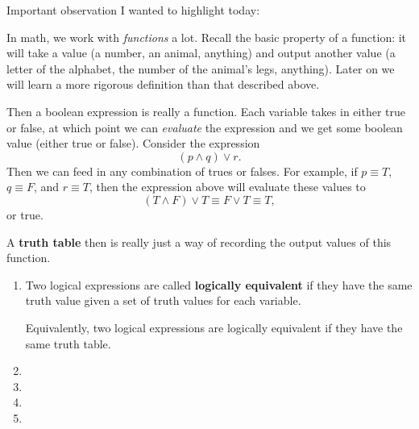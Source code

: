 Important observation I wanted to highlight today:

\begin{tcolorbox}
In math, we work with \textit{functions} a lot. Recall the basic property of a function: it will take a value (a number, an animal, anything) and output another value (a letter of the alphabet, the number of the animal's legs, anything). Later on we will learn a more rigorous definition than that described above.
\end{tcolorbox}

Then a boolean expression is really a function. Each variable takes in either true or false, at which point we can \textit{evaluate} the expression and we get some boolean value (either true or false). Consider the expression
\[(p \land q) \lor r.\]
Then we can feed in any combination of trues or falses. For example, if $p \equiv T$, $q \equiv F$, and $r \equiv T$, then the expression above will evaluate these values to 
\[(T \land F) \lor T \equiv F \lor T \equiv T,\] or true.

A \textbf{truth table} then is really just a way of recording the output values of this function.

 \begin{enumerate}
   \item 
   \begin{tcolorbox}
Two logical expressions are called \textbf{logically equivalent} if they have the same truth value given a set of truth values for each variable.

Equivalently, two logical expressions are logically equivalent if they have the same truth table.
\end{tcolorbox}
    \item 
    \item 
    \item 
    \item 
 \end{enumerate}
